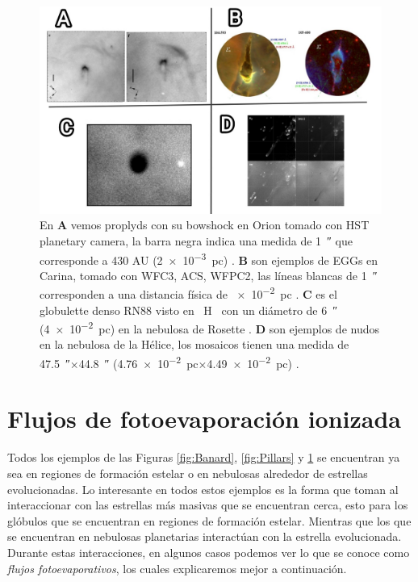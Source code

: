 \documentclass{book}
\begin{document}
\begin{figure}[htb]
    \centering
    \includegraphics[width=1 \textwidth]{images Chapter 1/C1_Globulettes.jpg}
    \caption{En \textbf{A} vemos proplyds con su bowshock en Orion tomado con HST planetary camera, la barra negra indica una medida de \SI{1}{\arcsecond} que corresponde a 430 AU (\SI{2e-3}{pc}) \citep{Garcia-Arredondo:2001}. \textbf{B} son ejemplos de EGGs en Carina, tomado con WFC3, ACS, WFPC2, las líneas blancas de \SI{1}{\arcsecond} corresponden a una distancia física de \SI{e-2}{pc} \citep{Mesa-Delgado:2016}. \textbf{C} es el globulette denso RN88 visto en \SI{}{H\alpha} con un diámetro de \SI{6}{\arcsecond} (\SI{4e-2}{pc}) en la nebulosa de Rosette \citep{GFGahm:2013}. \textbf{D} son ejemplos de nudos en la nebulosa de la Hélice, los mosaicos tienen una medida de \SI{47.5}{\arcsecond}$\times$\SI{44.8}{\arcsecond} (\SI{4.76e-2}{pc}$\times$\SI{4.49e-2}{pc}) \citep{O'Dell:2007}. }
    \label{fig:nudos}
\end{figure}



\section{Flujos de fotoevaporación ionizada} \label{Sec:fluijos fotoevaporativos}

Todos los ejemplos de las Figuras \ref{fig:Banard}, \ref{fig:Pillars} y \ref{fig:nudos} se encuentran ya sea en regiones de formación estelar o en nebulosas alrededor de estrellas evolucionadas. Lo interesante en todos estos ejemplos es la forma que toman al interaccionar con las estrellas más masivas que se encuentran cerca, esto para los glóbulos que se encuentran en regiones de formación estelar.  Mientras que los que se encuentran en nebulosas planetarias interactúan con la estrella evolucionada. Durante estas interacciones, en algunos casos podemos ver lo que se conoce como \textit{flujos fotoevaporativos}, los cuales explicaremos mejor a continuación.
\end{document}

